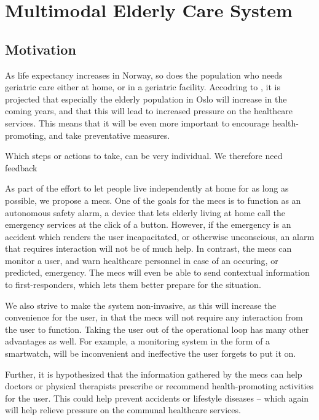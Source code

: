 \section{Multimodal Elderly Care System}
\subsection{Motivation}
As life expectancy increases in Norway, so does the population who needs geriatric care either at home, or in a geriatric facility. Accodring to \cite{oslohelsa}, it is projected that especially the elderly population in Oslo will increase in the coming years, and that this will lead to increased pressure on the healthcare services. This means that it will be even more important to encourage health-promoting, and take preventative measures.

Which steps or actions to take, can be very individual. We therefore need feedback 

As part of the effort to let people live independently at home for as long as possible, we propose a \gls{mecs}. One of the goals for the \gls{mecs} is to function as an autonomous safety alarm, a device that lets elderly living at home call the emergency services at the click of a button. However, if the emergency is an accident which renders the user incapacitated, or otherwise unconscious, an alarm that requires interaction will not be of much help. In contrast, the \gls{mecs} can monitor a user, and warn healthcare personnel in case of an occuring, or predicted, emergency. The \gls{mecs} will even be able to send contextual information to first-responders, which lets them better prepare for the situation.

We also strive to make the system non-invasive, as this will increase the convenience for the user, in that the \gls{mecs} will not require any interaction from the user to function. Taking the user out of the operational loop has many other advantages as well. For example, a monitoring system in the form of a smartwatch, will be inconvenient and ineffective the user forgets to put it on.

Further, it is hypothesized that the information gathered by the \gls{mecs} can help doctors or physical therapists prescribe or recommend health-promoting activities for the user. This could help prevent accidents or lifestyle diseases -- which again will help relieve pressure on the communal healthcare services.

